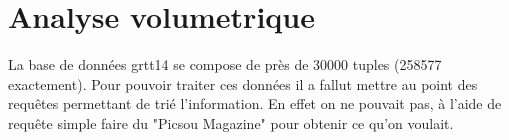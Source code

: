 \chapter{Analyse volumetrique}
La base de données grtt14 se compose de près de 30000 tuples (258577 exactement).
Pour pouvoir traiter ces données il a fallut mettre au point des requêtes permettant de trié l'information. En effet on ne pouvait pas, à l'aide de requête simple faire du "Picsou Magazine" pour obtenir ce qu'on voulait. 
